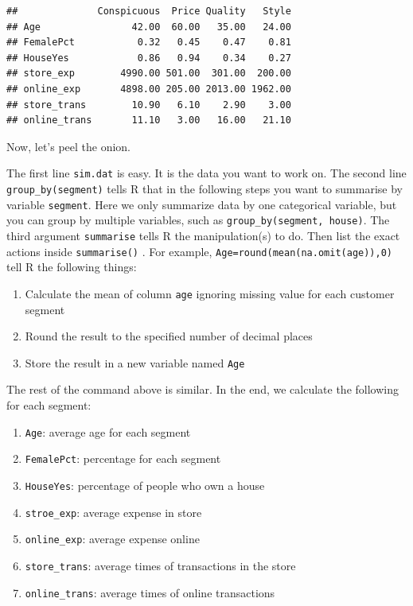 \documentclass[
  12pt,
]{krantz}
\providecommand{\tightlist}{%
  \setlength{\itemsep}{0pt}\setlength{\parskip}{0pt}}
\begin{document}
\begin{verbatim}
##              Conspicuous  Price Quality   Style
## Age                42.00  60.00   35.00   24.00
## FemalePct           0.32   0.45    0.47    0.81
## HouseYes            0.86   0.94    0.34    0.27
## store_exp        4990.00 501.00  301.00  200.00
## online_exp       4898.00 205.00 2013.00 1962.00
## store_trans        10.90   6.10    2.90    3.00
## online_trans       11.10   3.00   16.00   21.10
\end{verbatim}

Now, let's peel the onion.

The first line \texttt{sim.dat} is easy. It is the data you want to work on. The second line \texttt{group\_by(segment)} tells R that in the following steps you want to summarise by variable \texttt{segment}. Here we only summarize data by one categorical variable, but you can group by multiple variables, such as \texttt{group\_by(segment,\ house)}. The third argument \texttt{summarise} tells R the manipulation(s) to do. Then list the exact actions inside \texttt{summarise()} . For example, \texttt{Age=round(mean(na.omit(age)),0)} tell R the following things:

\begin{enumerate}
\def\labelenumi{\arabic{enumi}.}
\tightlist
\item
  Calculate the mean of column \texttt{age} ignoring missing value for each customer segment
\item
  Round the result to the specified number of decimal places
\item
  Store the result in a new variable named \texttt{Age}
\end{enumerate}

The rest of the command above is similar. In the end, we calculate the following for each segment:

\begin{enumerate}
\def\labelenumi{\arabic{enumi}.}
\tightlist
\item
  \texttt{Age}: average age for each segment
\item
  \texttt{FemalePct}: percentage for each segment
\item
  \texttt{HouseYes}: percentage of people who own a house
\item
  \texttt{stroe\_exp}: average expense in store
\item
  \texttt{online\_exp}: average expense online
\item
  \texttt{store\_trans}: average times of transactions in the store
\item
  \texttt{online\_trans}: average times of online transactions
\end{enumerate}
\end{document}
